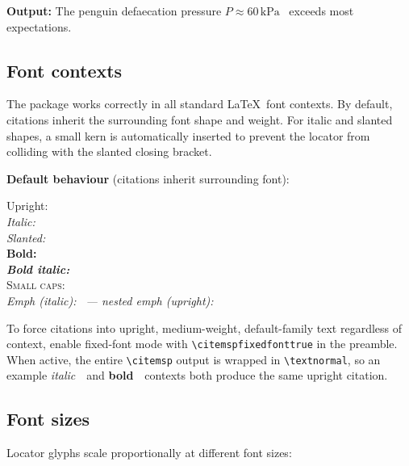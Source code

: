 \documentclass[11pt, a4paper]{article}
\newcommand{\cmd}[1]{\texttt{\textbackslash #1}}
\begin{document}
\noindent\textbf{Output:} The penguin defaecation pressure
$P \approx 60\,\mathrm{kPa}$~
exceeds most expectations.


\subsection{Font contexts}

The package works correctly in all standard \LaTeX\ font contexts.
By default, citations inherit the surrounding font shape and weight.
For italic and slanted shapes, a small kern is automatically inserted to
prevent the locator from colliding with the slanted closing bracket.

\medskip
\noindent\textbf{Default behaviour} (citations inherit surrounding font):

\begin{tcolorbox}[colback=blue!3, colframe=blue!30, boxrule=0.5pt, arc=2pt,
  top=6pt, bottom=6pt, left=10pt, right=10pt]
Upright:~\\[3pt]
\textit{Italic:~}\\[3pt]
\textsl{Slanted:~}\\[3pt]
\textbf{Bold:~}\\[3pt]
\textbf{\textit{Bold italic:~}}\\[3pt]
\textsc{Small caps:~}\\[3pt]
\emph{Emph (italic):~
  --- \emph{nested emph (upright):~}}
\end{tcolorbox}

\noindent To force citations into upright, medium-weight, default-family text regardless of context, enable fixed-font mode with \verb|\citemspfixedfonttrue| in the preamble.  When active, the entire \cmd{citemsp} output is wrapped in \cmd{textnormal}, so an example \textit{italic}~\begingroup\citemspfixedfonttrue{}\endgroup\ and \textbf{bold}~\begingroup\citemspfixedfonttrue{}\endgroup\ contexts both produce the same upright citation.


\subsection{Font sizes}

Locator glyphs scale proportionally at different font sizes:
\end{document}

